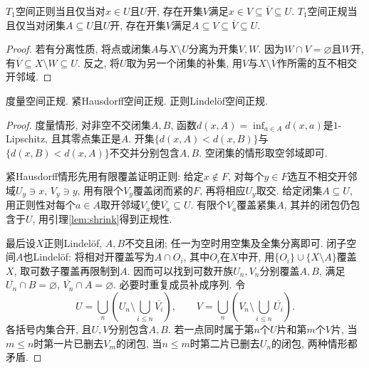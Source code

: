 \begin{lemma}\label{lem:shrink}
$T_1$空间正则当且仅当对$x\in U$且$U$开, 存在开集$V$满足$x\in V\subseteq\overline V\subseteq U$. $T_1$空间正规当且仅当对闭集$A\subseteq U$且$U$开, 存在开集$V$满足$A\subseteq V\subseteq\overline V\subseteq U$.
\end{lemma}
\begin{proof}
若有分离性质, 将点或闭集$A$与$X\setminus U$分离为开集$V,W$. 因为$W\cap V=\varnothing$且$W$开, 有$\overline V\subseteq X\setminus W\subseteq U$. 反之, 将$U$取为另一个闭集的补集, 用$V$与$X\setminus\overline V$作所需的互不相交开邻域.
\end{proof}

\begin{proposition}\label{thm:normal-examples}
度量空间正规. 紧Hausdorff空间正规. 正则Lindel\"of空间正规.
\end{proposition}
\begin{proof}
度量情形, 对非空不交闭集$A,B$, 函数$d(x,A)=\inf_{a\in A}d(x,a)$是$1$-Lipschitz, 且其零点集正是$A$. 开集$\{d(x,A)<d(x,B)\}$与$\{d(x,B)<d(x,A)\}$不交并分别包含$A,B$. 空闭集的情形取空邻域即可.

紧Hausdorff情形先用有限覆盖证明正则: 给定$x\notin F$, 对每个$y\in F$选互不相交开邻域$U_y\ni x$, $V_y\ni y$, 用有限个$V_y$覆盖闭而紧的$F$, 再将相应$U_y$取交. 给定闭集$A\subseteq U$, 用正则性对每个$a\in A$取开邻域$V_a$使$\overline{V_a}\subseteq U$. 有限个$V_a$覆盖紧集$A$, 其并的闭包仍包含于$U$, 用引理\ref{lem:shrink}得到正规性.

最后设$X$正则Lindel\"of, $A,B$不交且闭; 任一为空时用空集及全集分离即可. 闭子空间$A$也Lindel\"of: 将相对开覆盖写为$A\cap O_i$, 其中$O_i$在$X$中开, 用$\{O_i\}\cup\{X\setminus A\}$覆盖$X$, 取可数子覆盖再限制到$A$. 因而可以找到可数开族$U_n,V_n$分别覆盖$A,B$, 满足$\overline{U_n}\cap B=\varnothing$, $\overline{V_n}\cap A=\varnothing$. 必要时重复成员补成序列. 令
\[
 U=\bigcup_n\left(U_n\setminus\bigcup_{i\le n}\overline{V_i}\right),\qquad
 V=\bigcup_n\left(V_n\setminus\bigcup_{i\le n}\overline{U_i}\right).
\]
各括号内集合开, 且$U,V$分别包含$A,B$. 若一点同时属于第$n$个$U$片和第$m$个$V$片, 当$m\le n$时第一片已删去$V_m$的闭包, 当$n\le m$时第二片已删去$U_n$的闭包, 两种情形都矛盾.
\end{proof}

